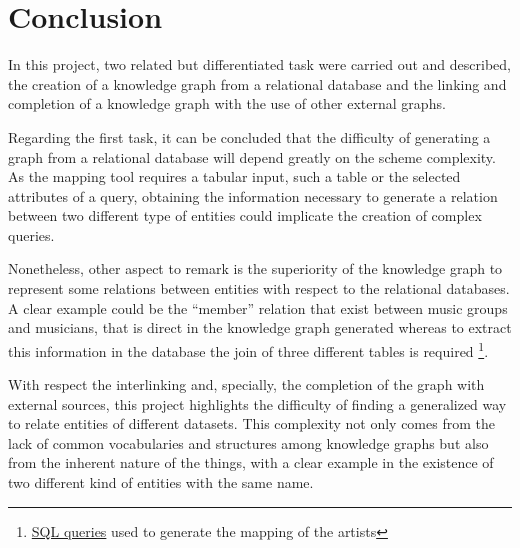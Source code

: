 \section{Conclusion}
In this project, two related but differentiated task were carried out and described, the creation of a knowledge graph from a relational database and the linking and completion of a knowledge graph with the use of other external graphs. 

Regarding the first task, it can be concluded that the difficulty of generating a graph from a relational database will depend greatly on the scheme complexity. 
As the mapping tool requires a tabular input, such a table or the selected attributes of a query, obtaining the information necessary to generate a relation between two different type of entities could implicate the creation of complex queries.  

Nonetheless, other aspect to remark is the superiority of the knowledge graph to represent some relations between entities with respect to the relational databases.
A clear example could be the ``member'' relation that exist between music groups and musicians, that is direct in the knowledge graph generated whereas to extract this information in the database the join of three different tables is required \footnote{\href{https://github.com/adrigrillo/music_kg/blob/master/queries/sql/query-artist.sql}{SQL queries} used to generate the mapping of the artists}.  

With respect the interlinking and, specially, the completion of the graph with external sources, this project highlights the difficulty of finding a generalized way to relate entities of different datasets. 
This complexity not only comes from the lack of common vocabularies and structures among knowledge graphs but also from the inherent nature of the things, with a clear example in the existence of two different kind of entities with the same name. 